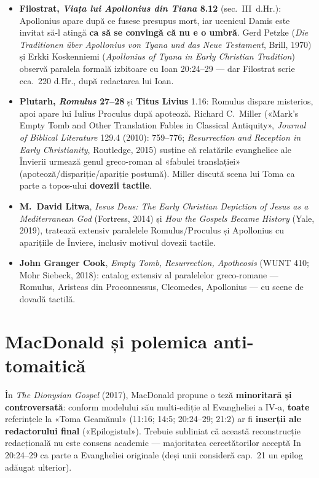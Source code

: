 \documentclass[12pt,a4paper,twoside,openany]{book}
\begin{document}
\begin{itemize}
  \item \textbf{Filostrat, \textit{Viața lui Apollonius din Tiana} 8.12} (sec.~III~d.Hr.): Apollonius apare după ce fusese presupus mort, iar ucenicul Damis este invitat să-l atingă \textbf{ca să se convingă că nu e o umbră}. Gerd Petzke (\textit{Die Traditionen über Apollonius von Tyana und das Neue Testament}, Brill, 1970) și Erkki Koskenniemi (\textit{Apollonius of Tyana in Early Christian Tradition}) observă paralela formală izbitoare cu Ioan 20:24--29 --- dar Filostrat scrie cca.~220 d.Hr., după redactarea lui Ioan.
  \item \textbf{Plutarh, \textit{Romulus} 27--28} și \textbf{Titus Livius} 1.16: Romulus dispare misterios, apoi apare lui Iulius Proculus după apoteoză. Richard C.~Miller («Mark's Empty Tomb and Other Translation Fables in Classical Antiquity», \textit{Journal of Biblical Literature} 129.4 (2010): 759--776; \textit{Resurrection and Reception in Early Christianity}, Routledge, 2015) susține că relatările evanghelice ale Învierii urmează genul greco-roman al «fabulei translației» (apoteoză/dispariție/apariție postumă). Miller discută scena lui Toma ca parte a topos-ului \textbf{dovezii tactile}.
  \item \textbf{M.~David Litwa}, \textit{Iesus Deus: The Early Christian Depiction of Jesus as a Mediterranean God} (Fortress, 2014) și \textit{How the Gospels Became History} (Yale, 2019), tratează extensiv paralelele Romulus/Proculus și Apollonius cu aparițiile de Înviere, inclusiv motivul dovezii tactile.
  \item \textbf{John Granger Cook}, \textit{Empty Tomb, Resurrection, Apotheosis} (WUNT 410; Mohr Siebeck, 2018): catalog extensiv al paralelelor greco-romane --- Romulus, Aristeas din Proconnessus, Cleomedes, Apollonius --- cu scene de dovadă tactilă.
\end{itemize}

\section{MacDonald și polemica anti-tomaitică}

În \textit{The Dionysian Gospel} (2017), MacDonald propune o teză \textbf{minoritară și controversată}: conform modelului său multi-ediție al Evangheliei a IV-a, \textbf{toate} referințele la «Toma Geamănul» (11:16; 14:5; 20:24--29; 21:2) ar fi \textbf{inserții ale redactorului final} («Epilogistul»). Trebuie subliniat că această reconstrucție redacțională nu este consens academic --- majoritatea cercetătorilor acceptă In 20:24--29 ca parte a Evangheliei originale (deși unii consideră cap.~21 un epilog adăugat ulterior).
\end{document}
